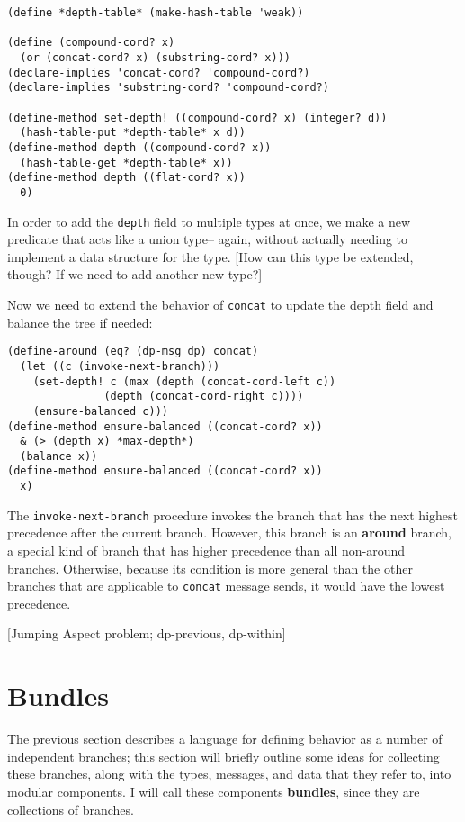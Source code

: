 \documentclass{article}
\newcommand{\defn}[1]{\textbf{#1}}
\newcommand{\code}[1]{\texttt{#1}}
\begin{document}
\begin{verbatim}
(define *depth-table* (make-hash-table 'weak))

(define (compound-cord? x)
  (or (concat-cord? x) (substring-cord? x)))
(declare-implies 'concat-cord? 'compound-cord?)
(declare-implies 'substring-cord? 'compound-cord?)

(define-method set-depth! ((compound-cord? x) (integer? d))
  (hash-table-put *depth-table* x d))
(define-method depth ((compound-cord? x))
  (hash-table-get *depth-table* x))
(define-method depth ((flat-cord? x))
  0)
\end{verbatim}

In order to add the \code{depth} field to multiple types at once, we
make a new predicate that acts like a union type-- again, without
actually needing to implement a data structure for the type.
[How can this type be extended, though?  If we need to add another new type?]

Now we need to extend the behavior of \code{concat} to update the
depth field and balance the tree if needed:

\begin{verbatim}
(define-around (eq? (dp-msg dp) concat)
  (let ((c (invoke-next-branch)))
    (set-depth! c (max (depth (concat-cord-left c))
		       (depth (concat-cord-right c))))
    (ensure-balanced c)))
(define-method ensure-balanced ((concat-cord? x))
  & (> (depth x) *max-depth*)
  (balance x))
(define-method ensure-balanced ((concat-cord? x))
  x)
\end{verbatim}

The \code{invoke-next-branch} procedure invokes the branch that has
the next highest precedence after the current branch.  However, this
branch is an \defn{around} branch, a special kind of branch that has
higher precedence than all non-around branches.  Otherwise, because
its condition is more general than the other branches that are
applicable to \code{concat} message sends, it would have the lowest
precedence.  

[Jumping Aspect problem; dp-previous, dp-within]

\section{Bundles}
\label{section:bundles}

The previous section describes a language for defining behavior as a
number of independent branches; this section will briefly outline some
ideas for collecting these branches, along with the types, messages,
and data that they refer to, into modular components.  I will call
these components \defn{bundles}, since they are collections of
branches.
\end{document}
